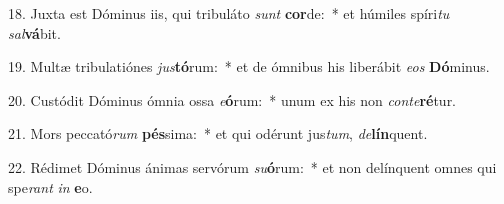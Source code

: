 18. Juxta est Dóminus iis, qui tribuláto \textit{sunt} \textbf{cor}de:~*  et húmiles spíri\textit{tu} \textit{sal}\textbf{vá}bit.\

19. Multæ tribulatiónes \textit{jus}\textbf{tó}rum:~*  et de ómnibus his liberábit \textit{e}\textit{os} \textbf{Dó}minus.\

20. Custódit Dóminus ómnia ossa \textit{e}\textbf{ó}rum:~*  unum ex his non \textit{con}\textit{te}\textbf{ré}tur.\

21. Mors peccató\textit{rum} \textbf{pés}sima:~*  et qui odérunt jus\textit{tum}, \textit{de}\textbf{lín}quent.\

22. Rédimet Dóminus ánimas servórum \textit{su}\textbf{ó}rum:~*  et non delínquent omnes qui spe\textit{rant} \textit{in} \textbf{e}o.\

